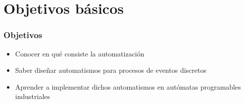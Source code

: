 \section{Objetivos básicos}

\begin{frame}[fragile, label=objetivos]
\frametitle{Objetivos}

\begin{itemize}
    \item Conocer en qué consiste la automatización
    
    \item Saber diseñar automatismos para procesos de eventos discretos

    \item Aprender a implementar dichos automatismos en autómatas programables industriales
       
\end{itemize}

\end{frame}